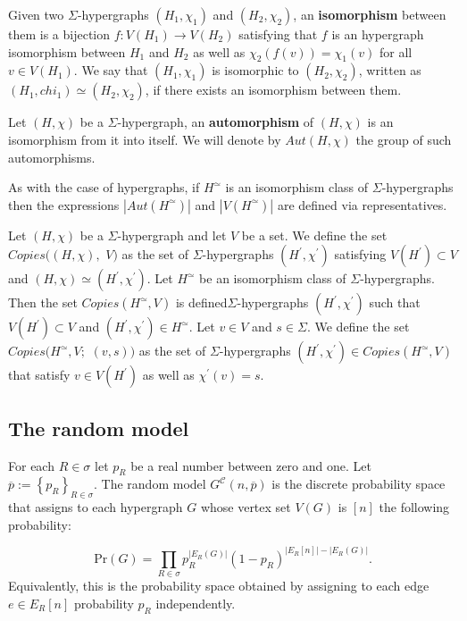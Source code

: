 \documentclass[12pt,notitlepage,a4paper]{article}
\theoremstyle{definition}
\newcommand{\InR}[1]{\left\{ #1_R \right\}_{R\in \sigma}}
\begin{document}
	Given two $\Sigma$-hypergraphs $(H_1,\chi_1)$
	and $(H_2,\chi_2)$, an \textbf{isomorphism} between them is
	a bijection $f:V(H_1)\rightarrow V(H_2)$ satisfying
	that $f$ is an hypergraph isomorphism between $H_1$ and
	$H_2$ as well as $\chi_2(f(v))=\chi_1(v)$ for all $v\in V(H_1)$.
	We say that $(H_1,\chi_1)$ is isomorphic to $(H_2,\chi_2)$,
	written as $(H_1, chi_1)\simeq (H_2,\chi_2)$, if there exists an
	isomorphism between them.
	\par	 
	Let $(H,\chi)$ be a $\Sigma$-hypergraph, an 
	\textbf{automorphism} of $(H,\chi)$ is an 
	isomorphism from it into itself. We will denote
	by $Aut(H,\chi)$ the group of such automorphisms. 
	\par
	As with the case of hypergraphs, if $H^\simeq$ is 
	an isomorphism class of $\Sigma$-hypergraphs
	then the expressions $|Aut(H^\simeq)|$ and
	$|V(H^\simeq)|$ are defined via representatives. \par
	Let $(H,\chi)$ be a $\Sigma$-hypergraph and let $V$ be a set.
	We define the set $Copies\big(
	(H,\chi),\, \, V\big)$ as the set of $\Sigma$-hypergraphs
	$(H^\prime,\chi^\prime)$ satisfying $V(H^\prime)\subset V$ and
	$(H,\chi)\simeq (H^\prime,\chi^\prime)$. Let $H^\simeq$ be 
	an isomorphism class of $\Sigma$-hypergraphs. Then the set
	$Copies(H^\simeq, V)$ is defined$\Sigma$-hypergraphs
	$(H^\prime,\chi^\prime)$ such that 
	$V(H^\prime)\subset V$ and
	$(H^\prime,\chi^\prime)\in H^\simeq$. 
	Let $v\in V$ and $s\in \Sigma$. We define the
	set $Copies\big(H^\simeq, V;\,\, (v,s)\big)$ 
	as the set of $\Sigma$-hypergraphs
	$(H^\prime,\chi^\prime)\in Copies(H^\simeq, V)$
	that satisfy $v\in V(H^\prime)$ as well as
	$\chi^\prime(v)=s$. 


\subsection{The random model}

For each $R\in \sigma$ let
$p_R$ be a real number between zero and one.
Let $\overline{p}:=\InR{p}$.
The random model $G^{\mathcal{C}}(n,\overline{p})$ 
is the discrete probability space that
assigns to each hypergraph $G$ whose vertex
set $V(G)$ is $[n]$ the following probability:

\[ \mathrm{Pr}(G)=\prod_{R\in \sigma} p_R^{|E_R(G)|}
(1-p_R)^{ \big|E_R[n]\big|-\big|E_R(G)\big|}.	
\]
Equivalently, this is the probability space obtained by 
assigning to each edge $e\in E_R[n]$ probability 
$p_R$ independently. \par
\end{document}
